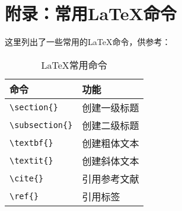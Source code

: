 \documentclass[12pt, a4paper]{ctexart} %
\begin{document}
\printbibliography %

\appendix
\section{附录：常用\LaTeX{}命令}
这里列出了一些常用的\LaTeX{}命令，供参考：

\begin{table}[htbp]
  \centering
  \caption{\LaTeX{}常用命令}
  \label{tab:latex-commands}
  \begin{tabular}{ll}
    \toprule
    命令 & 功能 \\
    \midrule
    \verb|\section{}| & 创建一级标题 \\
    \verb|\subsection{}| & 创建二级标题 \\
    \verb|\textbf{}| & 创建粗体文本 \\
    \verb|\textit{}| & 创建斜体文本 \\
    \verb|\cite{}| & 引用参考文献 \\
    \verb|\ref{}| & 引用标签 \\
    \bottomrule
  \end{tabular}
\end{table}
\end{document}
